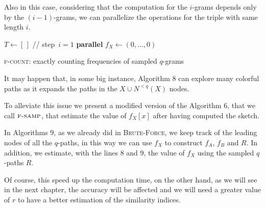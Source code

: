 Also in this case, considering that the computation for the $i$-grams depends only by the $(i-1)$-grams, we can parallelize the operations for the triple with same length $i$.

\begin{algorithm}[h]
	
	\small
	\DontPrintSemicolon
	\BlankLine
	$T\gets[\,]$ \quad // step~$i=1$\; 
	\BlankLine
	\textbf{parallel} 
	\BlankLine
	\BlankLine
	$f_X \gets (0,\ldots,0)$\;
	\BlankLine
	\BlankLine
	\caption{\textsc{f-count}: exactly counting frequencies of sampled $q$-grams}
	\label{alg:f-count}
\end{algorithm}

\clearpage

It may happen that, in some big instance, Algorithm 8 can explore many colorful paths as it expands the paths in the $X \cup N^{<q}(X)$ nodes.

To alleviate this issue we present a modified version of the Algorithm 6, that we call $\textsc{f-samp}$, that estimate the value of $f_{X}[x]$ after having computed the sketch.\medskip

In Algorithms 9, as we already did in \textsc{Brute-Force}, we keep track of the leading nodes of all the $q$-paths, in this way we can use $f_{X}$ to construct $f_A$, $f_B$ and $R$. In addition, we estimate, with the lines $8$ and $9$, the value of $f_X$ using the sampled $q$-paths $R$.\medskip

Of course, this speed up the computation time, on the other hand, as we will see in the next chapter, the accuracy will be affected and we will need a greater value of $r$ to have a better estimation of the similarity indices.

